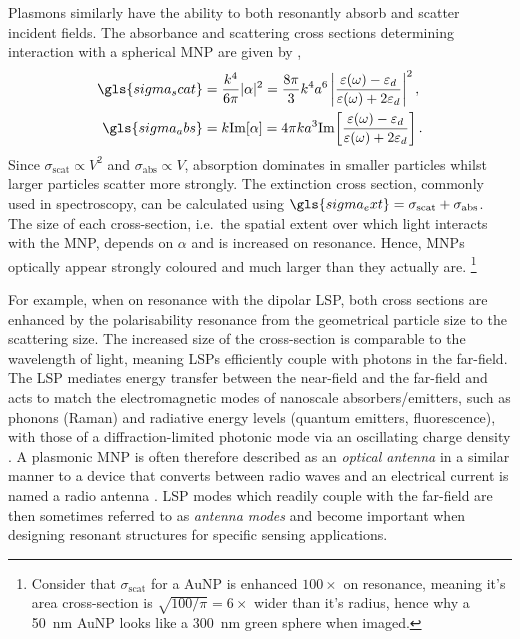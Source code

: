 \documentclass{article}
\begin{document}
Plasmons similarly have the ability to both resonantly absorb and scatter incident fields. The absorbance and scattering cross sections determining interaction with a spherical MNP are given by \cite{bohren2008absorption},
\begin{subequations}
\begin{align}
	\gls{sigma_scat} &= \frac{\wvm^4}{6\pi} |\alpha|^2 = \frac{8\pi}{3}\wvm^4a^6 \left| \frac{\dielectric - \epsdi}{\dielectric + 2\epsdi} \right|^2, \\
	\gls{sigma_abs} &= \wvm\imag{\alpha} = 4\pi \wvm a^3 \imag{ \frac{\dielectric - \epsdi}{\dielectric + 2\epsdi} }.
\end{align}
\end{subequations}
Since $\sigma_{\mathrm{scat}} \propto V^2$ and $\sigma_{\mathrm{abs}} \propto V$, absorption dominates in smaller particles whilst larger particles scatter more strongly. The extinction cross section, commonly used in spectroscopy, can be calculated using $\gls{sigma_ext}=\sigma_{\mathrm{scat}}+\sigma_{\mathrm{abs}}$. The size of each cross-section, i.e.\ the spatial extent over which light interacts with the MNP, depends on $\alpha$ and is increased on resonance. Hence, MNPs optically appear strongly coloured and much larger than they actually are.%
\footnote{Consider that $\sigma_{\mathrm{scat}}$ for a AuNP is enhanced $100\times$ on resonance, meaning it's area cross-section is $\sqrt{100/\pi}= 6\times$ wider than it's radius, hence why a \SI{50}{nm} AuNP looks like a \SI{300}{nm} green sphere when imaged.}

For example, when on resonance with the dipolar LSP, both cross sections are enhanced by the polarisability resonance from the geometrical particle size to the  scattering size. The increased size of the cross-section is comparable to the wavelength of light, meaning LSPs efficiently couple with photons in the far-field. The LSP mediates energy transfer between the near-field and the far-field and acts to match the electromagnetic modes of nanoscale absorbers/emitters, such as phonons (Raman) and radiative energy levels (quantum emitters, fluorescence), with those of a diffraction-limited photonic mode via an oscillating charge density \cite{berweger2012}. A plasmonic MNP is often therefore described as an \textit{optical antenna} in a similar manner to a device that converts between radio waves and an electrical current is named a radio antenna \cite{bharadwaj2009, novotny2011}. LSP modes which readily couple with the far-field are then sometimes referred to as \emph{antenna modes} and become important when designing resonant structures for specific sensing applications.
\end{document}
